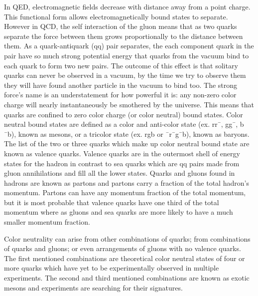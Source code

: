 In QED, electromagnetic fields decrease with distance away from a point charge. This functional form allows electromagnetically bound states to separate.
However in QCD, the self interaction of the gluon means that as two quarks
separate the force between them grows proportionally to the distance between them. As a
quark-antiquark (qq) pair separates, the each component quark in the pair have so much strong potential energy that quarks from the vacuum bind to each quark to form two new pairs. 
The outcome of this effect is that solitary quarks can never be observed in a vacuum, by the time we try to observe them they will have found another particle in the vacuum to bind too. The strong force's name is an understatement for how powerful it is: any non-zero color charge will nearly instantaneously be smothered by the universe. This means that quarks are confined to zero color charge (or color neutral) bound states. Color neutral bound states are defined as a color and anti-color state  (ex. rr¯, gg¯, b
¯b),  known as mesons, or a tricolor state (ex. rgb or ¯r¯g¯b), known as baryons. The list of the two or three quarks which make up color neutral bound state are known as valence quarks. Valence quarks are in the outermost shell of energy states for the hadron in contrast to sea quarks which are qq pairs made from gluon annihilations and fill all the lower states. Quarks and gluons found in hadrons are known as partons and partons carry a fraction of the total hadron's momentum. Partons can have any momentum fraction of the total momentum, but it is most probable that valence quarks have one third of the total momentum where as gluons and sea quarks are more likely to have a much smaller momentum fraction.

Color neutrality can arise from other combinations of quarks; from combinations of quarks and
gluons; or even arrangements of gluons with no valence quarks. The first mentioned combinations are theoretical color neutral states of four or more quarks which have yet to be experimentally observed in multiple experiments. The second and third mentioned combinations are known as exotic mesons and experiments are searching for their signatures.

